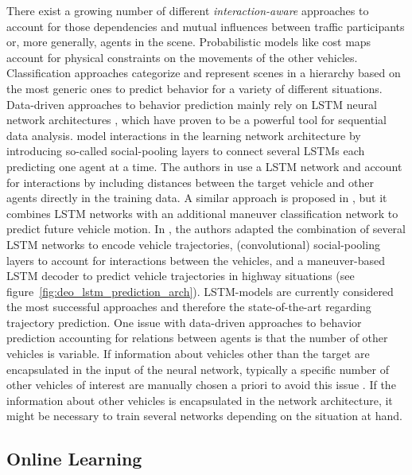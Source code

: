 There exist a growing number of different \emph{interaction-aware} approaches to account for those dependencies and mutual influences between traffic participants or, more generally, agents in the scene.
Probabilistic models like cost maps \cite{Bahram2016} account for physical constraints on the movements of the other vehicles.
Classification approaches categorize and represent scenes in a hierarchy \cite{Bonnin2012} based on the most generic ones to predict behavior for a variety of different situations.
Data-driven approaches to behavior prediction mainly rely on \ac{LSTM} neural network architectures \cite{Hochreiter1997}, which have proven to be a powerful tool for sequential data analysis.
\cite{Alahi2016} model interactions in the learning network architecture by introducing so-called social-pooling layers to connect several \acp{LSTM} each predicting one agent at a time.
The authors in \cite{Altche2018} use a \ac{LSTM} network and account for interactions by including distances between the target vehicle and other agents directly in the training data.
A similar approach is proposed in \cite{Deo2018}, but it combines \ac{LSTM} networks with an additional maneuver classification network to predict future vehicle motion.
In \cite{Deo2018a}, the authors adapted the combination of several \ac{LSTM} networks to encode vehicle trajectories, (convolutional) social-pooling layers to account for interactions between the vehicles, and a maneuver-based \ac{LSTM} decoder to predict vehicle trajectories in highway situations (see figure~\ref{fig:deo_lstm_prediction_arch}).
\ac{LSTM}-models are currently considered the most successful approaches and therefore the state-of-the-art regarding trajectory prediction.
One issue with data-driven approaches to behavior prediction accounting for relations between agents is that the number of other vehicles is variable.
If information about vehicles other than the target are encapsulated in the input of the neural network, typically a specific number of other vehicles of interest are manually chosen a priori to avoid this issue \cite{Altche2018, Deo2018}.
If the information about other vehicles is encapsulated in the network architecture, it might be necessary to train several networks depending on the situation at hand.

\subsection{Online Learning}%
\label{subsec:online_learning}

